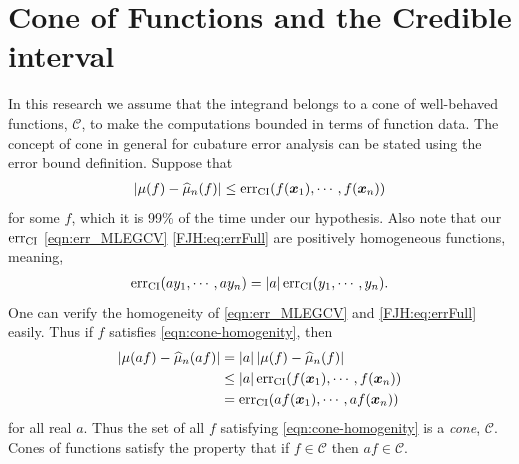 \documentclass{svjour3}                     %
\newcommand{\bm}[1]{\boldsymbol{#1}}
\newcommand{\vx}{\bm{x}}
\newcommand{\hmu}{\widehat{\mu}}
\newcommand{\CI}{\textup{CI}}
\newcommand{\NICE}{\textup{nice}}
\newcommand{\err}{\textup{err}}
\def\abs#1{\ensuremath{\left \lvert #1 \right \rvert}}
\newcommand{\JRNote}[1]{{\textcolor{green}{JR: #1}}}
\begin{document}


\section{Cone of Functions and the Credible interval} %
\label{sec:cone_of_functions}


In this research we assume that the integrand belongs to a cone of well-behaved functions, $\mathscr{C}$, to make the computations bounded in terms of function data. The concept of cone in general for cubature error analysis can be stated using the error bound definition. 
Suppose that 
\begin{align}
\label{eqn:cone-homogenity}
\abs{\mu(f) - \hmu_n(f)} \le \err_{\CI} (f(\vx_1), \cdots, f(\vx_n))
\end{align}
for some $f$, which it is 99\% of the time under our hypothesis. Also note that our $\err_{\CI}$ \eqref{eqn:err_MLEGCV} \eqref{FJH:eq:errFull} are positively homogeneous functions, meaning, 
\begin{align*}
\err_{\CI} (a y_1, \cdots, a y_n) = \abs{a} \err_{\CI} ( y_1, \cdots,  y_n).
\end{align*}
One can verify the homogeneity of \eqref{eqn:err_MLEGCV} and \eqref{FJH:eq:errFull} easily.
Thus if $f$ satisfies \eqref{eqn:cone-homogenity}, then
\begin{align*}
\abs{\mu(af) - \hmu_n(af)} &= \abs{a} \abs{\mu(f) - \hmu_n(f)} \\
& \le \abs{a} \err_{\CI} (f(\vx_1), \cdots, f(\vx_n) ) \\
& = \err_{\CI} (a f(\vx_1), \cdots, a f(\vx_n))
\end{align*}
for all real $a$. Thus the set of all $f$ satisfying \eqref{eqn:cone-homogenity} is a \emph{cone}, $\mathscr{C}$. Cones of functions satisfy the property that if $f \in \mathscr{C}$ then $af \in \mathscr{C}$.
\end{document}
